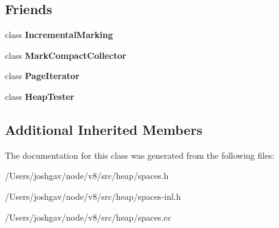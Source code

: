 \subsection*{Friends}
\begin{DoxyCompactItemize}
\item 
class {\bfseries Incremental\+Marking}\hypertarget{classv8_1_1internal_1_1_paged_space_abe19bf8497a23b6101b9916f8ac1d587}{}\label{classv8_1_1internal_1_1_paged_space_abe19bf8497a23b6101b9916f8ac1d587}

\item 
class {\bfseries Mark\+Compact\+Collector}\hypertarget{classv8_1_1internal_1_1_paged_space_ae585a96455613b2bc2ae3ea75a061d8b}{}\label{classv8_1_1internal_1_1_paged_space_ae585a96455613b2bc2ae3ea75a061d8b}

\item 
class {\bfseries Page\+Iterator}\hypertarget{classv8_1_1internal_1_1_paged_space_ae93be65f49fbfeb5716a90719b8c4cb7}{}\label{classv8_1_1internal_1_1_paged_space_ae93be65f49fbfeb5716a90719b8c4cb7}

\item 
class {\bfseries Heap\+Tester}\hypertarget{classv8_1_1internal_1_1_paged_space_aee0aab59f992bea8603b7be9e9b2f30d}{}\label{classv8_1_1internal_1_1_paged_space_aee0aab59f992bea8603b7be9e9b2f30d}

\end{DoxyCompactItemize}
\subsection*{Additional Inherited Members}


The documentation for this class was generated from the following files\+:\begin{DoxyCompactItemize}
\item 
/\+Users/joshgav/node/v8/src/heap/spaces.\+h\item 
/\+Users/joshgav/node/v8/src/heap/spaces-\/inl.\+h\item 
/\+Users/joshgav/node/v8/src/heap/spaces.\+cc\end{DoxyCompactItemize}
